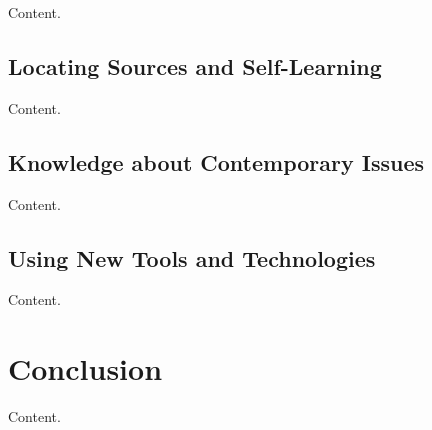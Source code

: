 \documentclass[10pt]{article}
\begin{document}

Content. \cite{something}

\subsection{Locating Sources and Self-Learning}


Content.

\subsection{Knowledge about Contemporary Issues}


Content.

\subsection{Using New Tools and Technologies}


Content.

\section{Conclusion}

Content. \cite{another}
\end{document}

